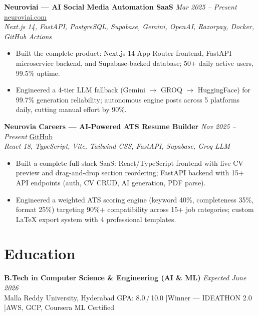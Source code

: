 \documentclass[9.5pt]{article}
\begin{document}
\vspace{1.5pt}
\textbf{Neuroviai --- AI Social Media Automation SaaS} \hfill \textit{Mar 2025 -- Present} \quad \href{https://neuroviai.com}{neuroviai.com}\\
\textit{Next.js 14, FastAPI, PostgreSQL, Supabase, Gemini, OpenAI, Razorpay, Docker, GitHub Actions}
\begin{itemize}
  \item Built the complete product: Next.js 14 App Router frontend, FastAPI microservice backend, and Supabase-backed database; 50+ daily active users, 99.5\% uptime.
  \item Engineered a 4-tier LLM fallback (Gemini $\rightarrow$ GROQ $\rightarrow$ HuggingFace) for 99.7\% generation reliability; autonomous engine posts across 5 platforms daily, cutting manual effort by 90\%.
\end{itemize}

\vspace{1.5pt}
\textbf{Neurovia Careers --- AI-Powered ATS Resume Builder} \hfill \textit{Nov 2025 -- Present} \quad \href{https://github.com/JeetInTech/CvForge-Online}{GitHub}\\
\textit{React 18, TypeScript, Vite, Tailwind CSS, FastAPI, Supabase, Groq LLM}
\begin{itemize}
  \item Built a complete full-stack SaaS: React/TypeScript frontend with live CV preview and drag-and-drop section reordering; FastAPI backend with 15+ API endpoints (auth, CV CRUD, AI generation, PDF parse).
  \item Engineered a weighted ATS scoring engine (keyword 40\%, completeness 35\%, format 25\%) targeting 90\%+ compatibility across 15+ job categories; custom LaTeX export system with 4 professional templates.
\end{itemize}

\section*{Education}
\textbf{B.Tech in Computer Science \& Engineering (AI \& ML)} \hfill \textit{Expected June 2026}\\
Malla Reddy University, Hyderabad \hfill GPA: 8.0\,/\,10.0 \quad|\quad Winner --- IDEATHON 2.0 \quad|\quad AWS, GCP, Coursera ML Certified
\end{document}
